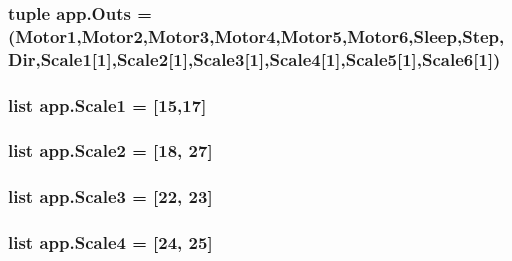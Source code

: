 \subsubsection[{\texorpdfstring{Outs}{Outs}}]{\setlength{\rightskip}{0pt plus 5cm}tuple app.\+Outs = ({\bf Motor1},{\bf Motor2},{\bf Motor3},{\bf Motor4},{\bf Motor5},{\bf Motor6},{\bf Sleep},{\bf Step},{\bf Dir},{\bf Scale1}\mbox{[}1\mbox{]},{\bf Scale2}\mbox{[}1\mbox{]},{\bf Scale3}\mbox{[}1\mbox{]},{\bf Scale4}\mbox{[}1\mbox{]},{\bf Scale5}\mbox{[}1\mbox{]},{\bf Scale6}\mbox{[}1\mbox{]})}\hypertarget{namespaceapp_aa94cb8ebbbec74a729187cb4a67f7177}{}\label{namespaceapp_aa94cb8ebbbec74a729187cb4a67f7177}
\subsubsection[{\texorpdfstring{Scale1}{Scale1}}]{\setlength{\rightskip}{0pt plus 5cm}list app.\+Scale1 = \mbox{[}15,17\mbox{]}}\hypertarget{namespaceapp_a97be8fdc0c27a5c7c9e902cbaa6d457d}{}\label{namespaceapp_a97be8fdc0c27a5c7c9e902cbaa6d457d}
\subsubsection[{\texorpdfstring{Scale2}{Scale2}}]{\setlength{\rightskip}{0pt plus 5cm}list app.\+Scale2 = \mbox{[}18, 27\mbox{]}}\hypertarget{namespaceapp_a932350a6d6a58d6b640a47acc0331c02}{}\label{namespaceapp_a932350a6d6a58d6b640a47acc0331c02}
\subsubsection[{\texorpdfstring{Scale3}{Scale3}}]{\setlength{\rightskip}{0pt plus 5cm}list app.\+Scale3 = \mbox{[}22, 23\mbox{]}}\hypertarget{namespaceapp_a59887e5f76ff2d0e764906131b09474e}{}\label{namespaceapp_a59887e5f76ff2d0e764906131b09474e}
\subsubsection[{\texorpdfstring{Scale4}{Scale4}}]{\setlength{\rightskip}{0pt plus 5cm}list app.\+Scale4 = \mbox{[}24, 25\mbox{]}}\hypertarget{namespaceapp_af9925deb9a0ad9408e7edba1245636c7}{}\label{namespaceapp_af9925deb9a0ad9408e7edba1245636c7}
